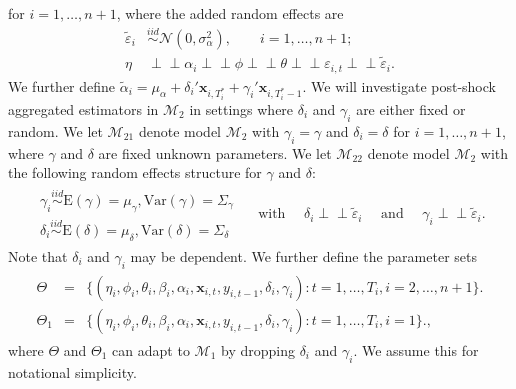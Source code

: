\documentclass[11pt]{article}
\def\mbf#1{\mathbf{#1}} %
\newcommand{\simiid}{\stackrel{iid}{\sim}} %
\newcommand{\indep}{\perp \!\!\! \perp } %
\def\mrm#1{\mathrm{#1}} %
\def\t#1{\tilde{#1}} %
\def\normal#1#2{\mathcal{N}(#1,#2)} %
\def\mc#1{\mathcal{#1}} %
\def\var#1{\mathrm{Var}(#1)} %
\theoremstyle{definition}
\begin{document}
for $i = 1, \ldots, n+1$, where the added random effects are
\begin{align*}
\t{\varepsilon}_{i} &\simiid  \normal{0}{\sigma^2_{\alpha}}, \qquad  i = 1, \ldots, n+1; \\
\eta &\indep  \alpha_i \indep \phi \indep \theta \indep \varepsilon_{i,t} \indep \t{\varepsilon}_{i}.
\end{align*}
We further define 
$\tilde{\alpha}_i=\mu_{\alpha}+\delta_i'\mbf{x}_{i, T_i^*}+\gamma_i'\mbf{x}_{i, T_i^*-1}$. 
We will investigate post-shock aggregated estimators in $\mc{M}_2$ 
in settings where $\delta_i$ and $\gamma_i$ are either fixed or random. 
We let $\mc{M}_{21}$ denote model $\mc{M}_{2}$ with $\gamma_i = \gamma$ 
and $\delta_i = \delta$ for $i= 1, \ldots, n+1$, 
where $\gamma$ and $\delta$ are fixed unknown parameters.
We let $\mc{M}_{22}$ denote model $\mc{M}_{2}$ with the following random effects 
structure for $\gamma$ and $\delta$:
\begin{align*}
\begin{array}{c}
  \gamma_i \overset{iid}{\sim} \mrm{E}(\gamma) = \mu_\gamma, \var{\gamma} = \Sigma_\gamma \\
  \delta_i \overset{iid}{\sim} \mrm{E}(\delta) = \mu_\delta, \var{\delta} = \Sigma_\delta
\end{array}
   \quad \text{ with } \quad  \delta_i  \indep \t{\varepsilon}_{i} \quad  \text{ and } \quad \gamma_i  \indep \t{\varepsilon}_{i}.
\end{align*}
Note that $\delta_i$ and $\gamma_i$ may be dependent. We further define the parameter sets
\begin{align}
  \begin{array}{lll}
     \Theta &= &\{(\eta_i, \phi_i, \theta_i, \beta_i, \alpha_i, \mbf{x}_{i,t}, y_{i,t-1}, \delta_i, \gamma_i)\colon t= 1, \ldots, T_i, i = 2, \ldots, n +1\}.\\
    \Theta_1 &= &\{(\eta_i, \phi_i, \theta_i, \beta_i, \alpha_i, \mbf{x}_{i,t}, y_{i,t-1}, \delta_i, \gamma_i)\colon t= 1, \ldots, T_i, i = 1\}.\label{parameter},
  \end{array}
\end{align}
where $\Theta$ and $\Theta_1$ can adapt to $\mc{M}_1$ by dropping $\delta_i$ and 
$\gamma_i$. We assume this for notational simplicity.
\end{document}
